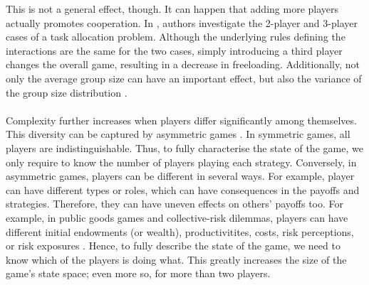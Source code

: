 \documentclass[11pt]{article}
\theoremstyle{plainCl1}
\theoremstyle{plainCl2}
\begin{document}
This is not a general effect, though. It can happen that adding more players actually promotes cooperation. In \cite{gokhale:JTB:2011}, authors investigate the 2-player and 3-player cases of a task allocation problem. Although the underlying rules defining the interactions are the same for the two cases, simply introducing a third player changes the overall game, resulting in a decrease in freeloading.
Additionally, not only the average group size can have an important effect, but also the variance of the group size distribution \cite{Pena:Evolution:2011, Broom:BMB:2019}.
\\ \\ 
\noindent Complexity further increases when players differ significantly among themselves. This diversity can be captured by asymmetric games \cite{Taylor:JAP:1979, Schuster:AB:1981, Gaunersdorfer:TPB:1991, Hofbauer:JMB:1996, Hofbauer:GEB:2005, Ohtsuki:JTB:2010, McAvoy:PlosCB:2015, Veller:JET:2016, Hauser:Nature:2019}. In symmetric games, all players are indistinguishable. Thus, to fully characterise the state of the game, we only require to know the number of players playing each strategy. Conversely, in asymmetric games, players can be different in several ways. For example, player can have different types or roles, which can have consequences in the payoffs and strategies. Therefore, they can have uneven effects on others' payoffs too. For example, in public goods games and collective-risk dilemmas, players can have different initial endowments (or wealth), productivitites, costs, risk perceptions, or risk exposures \cite{Milinski:CC:2011, Vasconcelos:PNAS:2014, Abouchakra:JTB:2014, Hauser:Nature:2019, Merhej:JAIR:2022}. Hence, to fully describe the state of the game, we need to know which of the players is doing what. This greatly increases the size of the game's state space; even more so, for more than two players.  \\ \\ 
\end{document}
